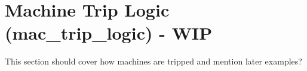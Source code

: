 \section{Machine Trip Logic (mac\_trip\_logic)  - WIP}  
This section should cover how machines are tripped and mention later examples?